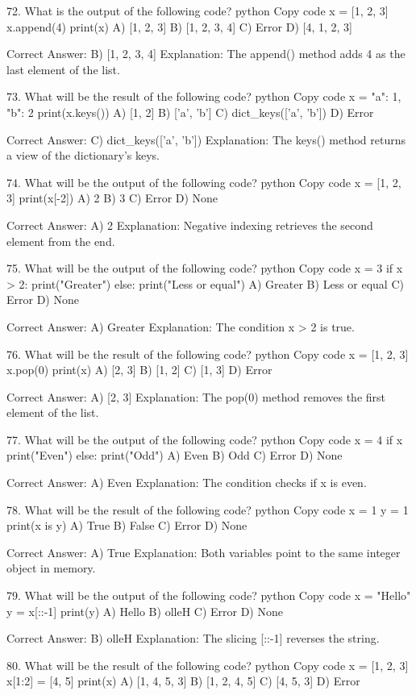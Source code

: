 72. What is the output of the following code?
python
Copy code
x = [1, 2, 3]
x.append(4)
print(x)
A) [1, 2, 3]
B) [1, 2, 3, 4]
C) Error
D) [4, 1, 2, 3]

Correct Answer: B) [1, 2, 3, 4]
Explanation: The append() method adds 4 as the last element of the list.

73. What will be the result of the following code?
python
Copy code
x = {"a": 1, "b": 2}
print(x.keys())
A) [1, 2]
B) ['a', 'b']
C) dict_keys(['a', 'b'])
D) Error

Correct Answer: C) dict_keys(['a', 'b'])
Explanation: The keys() method returns a view of the dictionary's keys.

74. What will be the output of the following code?
python
Copy code
x = [1, 2, 3]
print(x[-2])
A) 2
B) 3
C) Error
D) None

Correct Answer: A) 2
Explanation: Negative indexing retrieves the second element from the end.

75. What will be the output of the following code?
python
Copy code
x = 3
if x > 2:
    print("Greater")
else:
    print("Less or equal")
A) Greater
B) Less or equal
C) Error
D) None

Correct Answer: A) Greater
Explanation: The condition x > 2 is true.

76. What will be the result of the following code?
python
Copy code
x = [1, 2, 3]
x.pop(0)
print(x)
A) [2, 3]
B) [1, 2]
C) [1, 3]
D) Error

Correct Answer: A) [2, 3]
Explanation: The pop(0) method removes the first element of the list.

77. What will be the output of the following code?
python
Copy code
x = 4
if x %
    print("Even")
else:
    print("Odd")
A) Even
B) Odd
C) Error
D) None

Correct Answer: A) Even
Explanation: The condition checks if x is even.

78. What will be the result of the following code?
python
Copy code
x = 1
y = 1
print(x is y)
A) True
B) False
C) Error
D) None

Correct Answer: A) True
Explanation: Both variables point to the same integer object in memory.

79. What will be the output of the following code?
python
Copy code
x = "Hello"
y = x[::-1]
print(y)
A) Hello
B) olleH
C) Error
D) None

Correct Answer: B) olleH
Explanation: The slicing [::-1] reverses the string.

80. What will be the result of the following code?
python
Copy code
x = [1, 2, 3]
x[1:2] = [4, 5]
print(x)
A) [1, 4, 5, 3]
B) [1, 2, 4, 5]
C) [4, 5, 3]
D) Error

